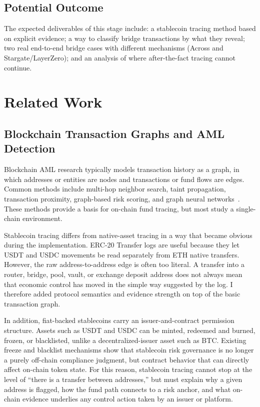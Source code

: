 \documentclass[12pt,a4paper]{article}
\begin{document}
\subsection{Potential Outcome}

The expected deliverables of this stage include: a stablecoin tracing method based on explicit evidence; a way to classify bridge transactions by what they reveal; two real end-to-end bridge cases with different mechanisms (Across and Stargate/LayerZero); and an analysis of where after-the-fact tracing cannot continue.

\section{Related Work}

\subsection{Blockchain Transaction Graphs and AML Detection}

Blockchain AML research typically models transaction history as a graph, in which addresses or entities are nodes and transactions or fund flows are edges. Common methods include multi-hop neighbor search, taint propagation, transaction proximity, graph-based risk scoring, and graph neural networks~\cite{weber2019,bellei2024}. These methods provide a basis for on-chain fund tracing, but most study a single-chain environment.

Stablecoin tracing differs from native-asset tracing in a way that became obvious during the implementation. ERC-20 Transfer logs are useful because they let USDT and USDC movements be read separately from ETH native transfers. However, the raw address-to-address edge is often too literal. A transfer into a router, bridge, pool, vault, or exchange deposit address does not always mean that economic control has moved in the simple way suggested by the log. I therefore added protocol semantics and evidence strength on top of the basic transaction graph.

In addition, fiat-backed stablecoins carry an issuer-and-contract permission structure. Assets such as USDT and USDC can be minted, redeemed and burned, frozen, or blacklisted, unlike a decentralized-issuer asset such as BTC. Existing freeze and blacklist mechanisms show that stablecoin risk governance is no longer a purely off-chain compliance judgment, but contract behavior that can directly affect on-chain token state. For this reason, stablecoin tracing cannot stop at the level of ``there is a transfer between addresses,'' but must explain why a given address is flagged, how the fund path connects to a risk anchor, and what on-chain evidence underlies any control action taken by an issuer or platform.
\end{document}
